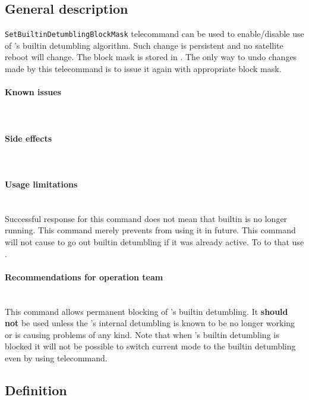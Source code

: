 
\subsection{General description}
\texttt{SetBuiltinDetumblingBlockMask} telecommand can be used to enable/disable use of 
\Imtq's builtin detumbling algorithm. Such change is persistent and no satellite reboot 
will change. The block mask is stored in . The only 
way to undo changes made by this telecommand is to issue it again with appropriate 
block mask.

\paragraph{Known issues} \mbox{} \\
\None

\paragraph{Side effects} \mbox{} \\
\None

\paragraph{Usage limitations} \mbox{} \\
Successful response for this command does not mean that builtin is no longer running. 
This command merely prevents \obc from using it in future. This command will not cause \obc
to go out builtin detumbling if it was already active. To to that use .

\paragraph{Recommendations for operation team} \mbox{} \\
This command allows permanent blocking of \Imtq's builtin detumbling. It \textbf{should not} 
be used unless the \Imtq's internal detumbling is known to be no longer working or is causing
problems of any kind. 
Note that when \Imtq's builtin detumbling is blocked it will not be possible to switch 
current \Adcs mode to the builtin detumbling even by using  telecommand.

\subsection{Definition}


